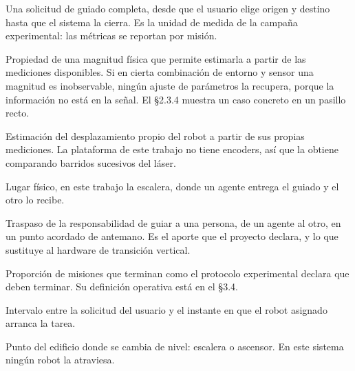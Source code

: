 \begin{description}[style=nextline,leftmargin=1.5em,itemsep=0.2em]
  \item[Misión] Una solicitud de guiado completa, desde que el usuario elige
    origen y destino hasta que el sistema la cierra. Es la unidad de medida de
    la campaña experimental: las métricas se reportan por misión.

  \item[Observabilidad] Propiedad de una magnitud física que permite estimarla a
    partir de las mediciones disponibles. Si en cierta combinación de entorno y
    sensor una magnitud es inobservable, ningún ajuste de parámetros la
    recupera, porque la información no está en la señal. El §2.3.4 muestra un
    caso concreto en un pasillo recto.

  \item[Odometría] Estimación del desplazamiento propio del robot a partir de
    sus propias mediciones. La plataforma de este trabajo no tiene encoders, así
    que la obtiene comparando barridos sucesivos del láser.

  \item[Punto de transferencia] Lugar físico, en este trabajo la escalera, donde
    un agente entrega el guiado y el otro lo recibe.

  \item[Relevo] Traspaso de la responsabilidad de guiar a una persona, de un
    agente al otro, en un punto acordado de antemano. Es el aporte que el
    proyecto declara, y lo que sustituye al hardware de transición vertical.

  \item[Tasa de éxito] Proporción de misiones que terminan como el protocolo
    experimental declara que deben terminar. Su definición operativa está en el
    §3.4.

  \item[Tiempo de respuesta] Intervalo entre la solicitud del usuario y el
    instante en que el robot asignado arranca la tarea.

  \item[Zona de transición] Punto del edificio donde se cambia de nivel:
    escalera o ascensor. En este sistema ningún robot la atraviesa.
\end{description}


